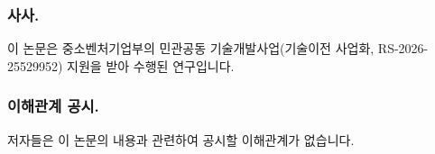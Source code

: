 \documentclass{llncs}
\renewcommand{\ackname}{사사.}
\renewcommand{\discintname}{이해관계 공시.}
\begin{document}





\begin{credits}
\subsubsection{\ackname}
이 논문은 중소벤처기업부의 민관공동 기술개발사업(기술이전 사업화,
RS-2026-25529952) 지원을 받아 수행된 연구입니다.

\subsubsection{\discintname}
저자들은 이 논문의 내용과 관련하여 공시할 이해관계가 없습니다.
\end{credits}
\end{document}

